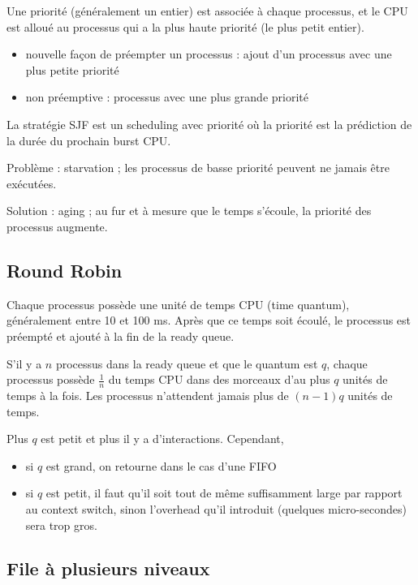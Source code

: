Une priorité (généralement un entier) est associée à chaque processus, et le CPU est alloué au processus qui a la plus haute priorité (le plus petit entier).

\begin{itemize}
	\item nouvelle façon de préempter un processus : ajout d'un processus avec une plus petite priorité
	\item non préemptive : processus avec une plus grande priorité
\end{itemize}


La stratégie SJF est un scheduling avec priorité où la priorité est la prédiction de la durée du prochain burst CPU.

Problème : starvation ; les processus de basse priorité peuvent ne jamais être exécutées.

Solution : aging ; au fur et à mesure que le temps s'écoule, la priorité des processus augmente.

\subsection{Round Robin}

Chaque processus possède une unité de temps CPU (time quantum), généralement entre 10 et 100 ms. Après que ce temps soit écoulé, le processus est préempté et ajouté à la fin de la ready queue.

S'il y a $n$ processus dans la ready queue et que le quantum est $q$, chaque processus possède $\frac{1}{n}$ du temps CPU dans des morceaux d'au plus $q$ unités de temps à la fois. Les processus n'attendent jamais plus de $(n - 1)q$ unités de temps.

Plus $q$ est petit et plus il y a d'interactions. Cependant,

\begin{itemize}
	\item si $q$ est grand, on retourne dans le cas d'une FIFO
	\item si $q$ est petit, il faut qu'il soit tout de même suffisamment large par rapport au context switch, sinon l'overhead qu'il introduit (quelques micro-secondes) sera trop gros.
\end{itemize}

\subsection{File à plusieurs niveaux}

